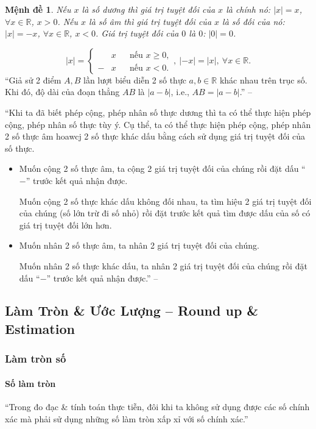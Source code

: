 \documentclass{article}
\numberwithin{equation}{section}
\newtheorem{menhde}{Mệnh đề}[section]
\begin{document}
\begin{menhde}
	Nếu $x$ là số dương thì giá trị tuyệt đối của $x$ là chính nó: $|x| = x$, $\forall x\in\mathbb{R}$, $x > 0$. Nếu $x$ là số âm thì giá trị tuyệt đối của $x$ là số đối của nó: $|x| = -x$, $\forall x\in\mathbb{R}$, $x < 0$. Giá trị tuyệt đối của $0$ là $0$: $|0| = 0$.
\end{menhde}
\begin{equation*}
	|x| = \left\{\begin{split}
		&x&&\mbox{nếu } x\ge 0,\\
		-&x&&\mbox{nếu } x < 0.
	\end{split}\right.,\ |-x| = |x|,\ \forall x\in\mathbb{R}.
\end{equation*}
``Giả sử 2 điểm $A,B$ lần lượt biểu diễn 2 số thực $a,b\in\mathbb{R}$ khác nhau trên trục số. Khi đó, độ dài của đoạn thẳng $AB$ là $|a - b|$, i.e., $AB = |a - b|$.'' -- \cite[p. 46]{SGK_Toan_7_Canh_Dieu_tap_1}

``Khi ta đã biết phép cộng, phép nhân số thực dương thì ta có thể thực hiện phép cộng, phép nhân số thực tùy ý. Cụ thể, ta có thể thực hiện phép cộng, phép nhân 2 số thực âm hoawcj 2 số thực khác dấu bằng cách sử dụng giá trị tuyệt đối của số thực.
\begin{itemize}
	\item Muốn cộng 2 số thực âm, ta cộng 2 giá trị tuyệt đối của chúng rồi đặt dấu ``$-$'' trước kết quả nhận được.
	
	Muốn cộng 2 số thực khác dấu không đối nhau, ta tìm hiệu 2 giá trị tuyệt đối của chúng (số lớn trừ đi số nhỏ) rồi đặt trước kết quả tìm được dấu của số có giá trị tuyệt đối lớn hơn.
	\item Muốn nhân 2 số thực âm, ta nhân 2 giá trị tuyệt đối của chúng.
	
	Muốn nhân 2 số thực khác dấu, ta nhân 2 giá trị tuyệt đối của chúng rồi đặt dấu ``$-$'' trước kết quả nhận được.'' -- \cite[p. 47]{SGK_Toan_7_Canh_Dieu_tap_1}
\end{itemize}

\subsection{Làm Tròn \& Ước Lượng -- Round up \& Estimation}

\subsubsection{Làm tròn số}

\paragraph{Số làm tròn}
``Trong đo đạc \& tính toán thực tiễn, đôi khi ta không sử dụng được các số chính xác mà phải sử dụng những số làm tròn xấp xỉ với số chính xác.''
\end{document}
